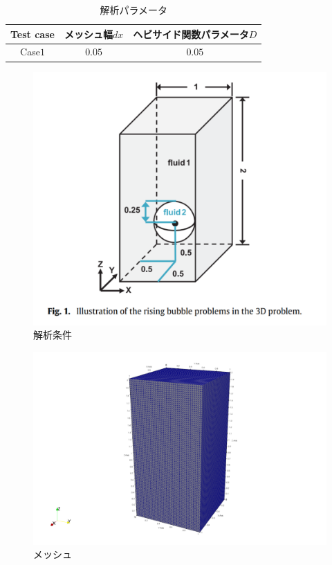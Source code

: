 \documentclass[8pt,a4paper]{article}
\begin{document}
\renewcommand{\arraystretch}{1}
\begin{table}[H]
	\centering
	\caption{解析パラメータ}
	\begin{tabular}{ccc}
		\hline
		Test case & メッシュ幅$dx$ & ヘビサイド関数パラメータ$D$\\
		\hline 
		Case$1$ & $0.05$ & $0.05$\\
		\hline         
	\end{tabular}
	\label{table:mars-env}
\end{table}
\renewcommand{\arraystretch}{1.0}

\begin{figure}[htbp]
	\centering
	\includegraphics[width=10truecm]{pics/3d-bubble/setting.pdf}
	\caption{解析条件~\cite{Safi2017}}
	\label{fig:3d-bubble-setting}
\end{figure}

\begin{figure}[htbp]
	\centering
	\includegraphics[width=10truecm]{pics/3d-bubble/mesh.pdf}
	\caption{メッシュ}
	\label{fig:3d-bubble-mesh}
\end{figure}
\end{document}
